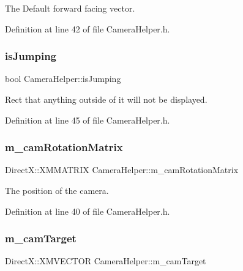 The Default forward facing vector. 



Definition at line 42 of file Camera\+Helper.\+h.

\mbox{\label{class_camera_helper_ac0dd816f2a5e8b4030b62e703ab92861}} 
\subsubsection{\texorpdfstring{is\+Jumping}{isJumping}}
{\footnotesize\ttfamily bool Camera\+Helper\+::is\+Jumping\hspace{0.3cm}{\ttfamily [private]}}



Rect that anything outside of it will not be displayed. 



Definition at line 45 of file Camera\+Helper.\+h.

\mbox{\label{class_camera_helper_a995de11be349b7d74075f08fa5e2f437}} 
\subsubsection{\texorpdfstring{m\+\_\+cam\+Rotation\+Matrix}{m\_camRotationMatrix}}
{\footnotesize\ttfamily Direct\+X\+::\+X\+M\+M\+A\+T\+R\+IX Camera\+Helper\+::m\+\_\+cam\+Rotation\+Matrix\hspace{0.3cm}{\ttfamily [private]}}



The position of the camera. 



Definition at line 40 of file Camera\+Helper.\+h.

\mbox{\label{class_camera_helper_abc1a814a0b54bfcb70f3e24bcd444f01}} 
\subsubsection{\texorpdfstring{m\+\_\+cam\+Target}{m\_camTarget}}
{\footnotesize\ttfamily Direct\+X\+::\+X\+M\+V\+E\+C\+T\+OR Camera\+Helper\+::m\+\_\+cam\+Target\hspace{0.3cm}{\ttfamily [private]}}




